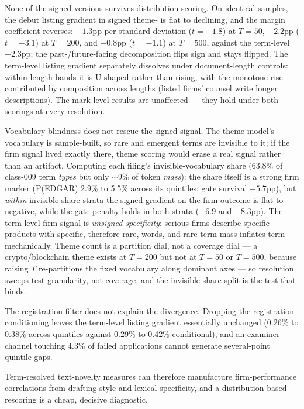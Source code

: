None of the signed versions survives distribution scoring. On identical
samples, the debut listing gradient in signed theme-\dkl{} is flat to
declining, and the margin coefficient reverses: $-1.3$pp per standard deviation
($t = -1.8$) at $T = 50$, $-2.2$pp ($t = -3.1$) at $T = 200$, and
$-0.8$pp ($t = -1.1$) at $T = 500$, against the term-level $+2.3$pp;
the past-/future-facing decomposition flips sign and stays
flipped. The term-level listing gradient separately dissolves under
document-length controls: within length bands it is U-shaped rather than
rising, with the monotone rise contributed by composition across lengths
(listed firms' counsel write longer descriptions). The mark-level
results are unaffected --- they hold under both scorings at every
resolution.

Vocabulary blindness does not rescue the signed signal. The theme
model's vocabulary is sample-built, so rare and emergent terms are
invisible to it; if the firm signal lived exactly there, theme scoring
would erase a real signal rather than an artifact. Computing each
filing's invisible-vocabulary share (63.8\% of class-009 term
\emph{types} but only $\sim$9\% of token \emph{mass}): the share itself
is a strong firm marker (P(EDGAR) 2.9\% to 5.5\% across its quintiles;
gate survival $+5.7$pp), but \emph{within} invisible-share strata the
signed \dkl{} gradient on the firm outcome is flat to negative, while
the gate penalty holds in both strata ($-6.9$ and $-8.3$pp). The
term-level firm signal is \emph{unsigned specificity}: serious firms
describe specific products with specific, therefore rare, words, and
rare-term mass inflates term-\dkl{} mechanically. Theme count is a
partition dial, not a coverage dial --- a crypto/blockchain theme exists
at $T = 200$ but not at $T = 50$ or $T = 500$, because raising $T$
re-partitions the fixed vocabulary along dominant axes --- so resolution
sweeps test granularity, not coverage, and the invisible-share split is
the test that binds.

The registration filter does not explain the divergence. Dropping the
registration conditioning leaves the term-level listing gradient
essentially unchanged (0.26\% to 0.38\% across quintiles against 0.29\%
to 0.42\% conditional), and an examiner channel touching 4.3\% of failed
applications cannot generate several-point quintile gaps.

Term-resolved text-novelty measures can therefore manufacture
firm-performance correlations from drafting style and lexical specificity,
and a distribution-based rescoring is a cheap, decisive diagnostic.

